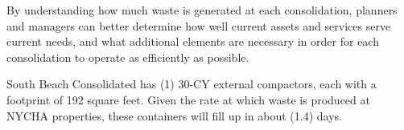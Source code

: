 
    By understanding how much waste is generated at each consolidation, planners and managers
    can better determine how well current assets and services serve current needs, and what additional 
    elements are necessary in order for each consolidation to operate as efficiently as possible. 

    South Beach Consolidated has (1) 30-CY external compactors, each with a footprint of 192 square feet. Given the rate at which waste is produced at NYCHA properties, these containers will fill
    up in about (1.4) days.